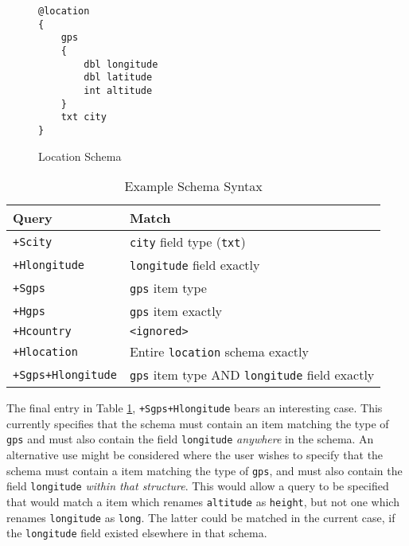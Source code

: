 \documentclass[12pt,twoside,notitlepage]{report}
\begin{document}
\begin{figure}[tbh]
\begin{lstlisting}
@location
{
	gps
	{
		dbl longitude
		dbl latitude
		int altitude
	}
	txt city
}
\end{lstlisting}
\caption{Location Schema}
\label{fig:locationschema}
\end{figure}

\begin{table}[tbh]
\centering

\begin{tabular}{l l}
\hline\hline
Query & Match \\
\hline

{\tt +Scity}		& {\tt city} field type ({\tt txt}) \\
{\tt +Hlongitude}	& {\tt longitude} field exactly \\

{\tt +Sgps}			& {\tt gps} item type \\
{\tt +Hgps}			& {\tt gps} item exactly \\

{\tt +Hcountry}		& {\tt <ignored>} \\
{\tt +Hlocation}	& Entire {\tt location} schema exactly \\

{\tt +Sgps+Hlongitude}	& {\tt gps} item type AND {\tt longitude} field exactly \\

\hline
\end{tabular}

\caption{Example Schema Syntax}
\label{tab:example_schema_syntax}
\end{table}

The final entry in Table \ref{tab:example_schema_syntax}, {\tt +Sgps+Hlongitude} bears an interesting case. 
This currently specifies that the schema must contain an item matching the type of {\tt gps} and must also contain the field {\tt longitude} {\sl anywhere} in the schema. 
An alternative use might be considered where the user wishes to specify that the schema must contain a item matching the type of {\tt gps}, and must also contain the field {\tt longitude} {\sl within that structure}. 
This would allow a query to be specified that would match a item which renames {\tt altitude} as {\tt height}, but not one which renames {\tt longitude} as {\tt long}. 
The latter could be matched in the current case, if the {\tt longitude} field existed elsewhere in that schema. 
\end{document}
